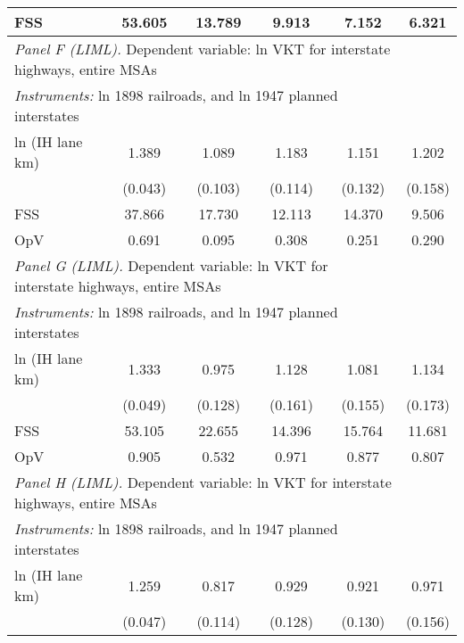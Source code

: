 \begin{table}[htbp]
\begin{tabular}{l*{5}{c}}
FSS                 &      53.605         &      13.789         &       9.913         &       7.152         &       6.321         \\
 
          \hline         
 \multicolumn{5}{l}{ \emph{Panel F (LIML).} Dependent variable: ln VKT for interstate highways, entire MSAs} \\ 
 \multicolumn{5}{l}{ \emph{Instruments:} ln 1898 railroads, and ln 1947 planned interstates} \\
ln (IH lane km)     &       1.389\sym{***}&       1.089\sym{***}&       1.183\sym{***}&       1.151\sym{***}&       1.202\sym{***}\\
                    &     (0.043)         &     (0.103)         &     (0.114)         &     (0.132)         &     (0.158)         \\
 
FSS                 &      37.866         &      17.730         &      12.113         &      14.370         &       9.506         \\
OpV                 &       0.691         &       0.095         &       0.308         &       0.251         &       0.290         \\
 
          \hline         
 \multicolumn{5}{l}{ \emph{Panel G (LIML).} Dependent variable: ln VKT for interstate highways, entire MSAs} \\ 
 \multicolumn{5}{l}{ \emph{Instruments:} ln 1898 railroads, and ln 1947 planned interstates} \\
ln (IH lane km)     &       1.333\sym{***}&       0.975\sym{***}&       1.128\sym{***}&       1.081\sym{***}&       1.134\sym{***}\\
                    &     (0.049)         &     (0.128)         &     (0.161)         &     (0.155)         &     (0.173)         \\
 
FSS                 &      53.105         &      22.655         &      14.396         &      15.764         &      11.681         \\
OpV                 &       0.905         &       0.532         &       0.971         &       0.877         &       0.807         \\
 
          \hline         
 \multicolumn{5}{l}{ \emph{Panel H (LIML).} Dependent variable: ln VKT for interstate highways, entire MSAs} \\ 
 \multicolumn{5}{l}{ \emph{Instruments:} ln 1898 railroads, and ln 1947 planned interstates} \\
ln (IH lane km)     &       1.259\sym{***}&       0.817\sym{***}&       0.929\sym{***}&       0.921\sym{***}&       0.971\sym{***}\\
                    &     (0.047)         &     (0.114)         &     (0.128)         &     (0.130)         &     (0.156)         \\
 

\end{tabular}
\end{table}
